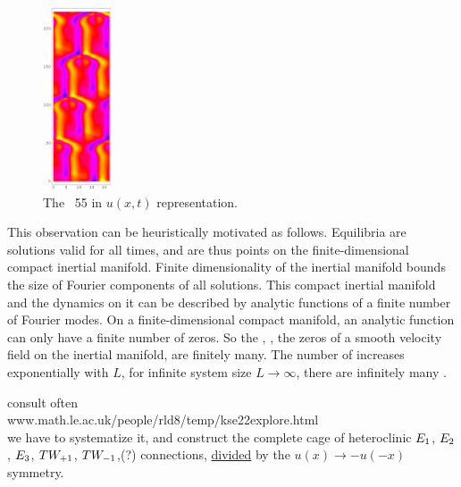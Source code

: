 \begin{figure}[t]
\begin{center} 
    \includegraphics[width=0.18\textwidth]{figs/rpo22-55-4-u.eps}
\end{center}
\caption{
 The \rpo\ {\nameit}55 in $u(x,t)$ representation. 
        }
\label{f:rpo55u}
\end{figure}




This observation can be heuristically motivated as follows. 
Equilibria are solutions valid for all times, and are thus points
on the finite-dimensional compact inertial manifold.
Finite dimensionality of the inertial manifold
bounds the size of Fourier components of all solutions.
This
compact inertial manifold and the dynamics on it can be 
described by analytic functions of a finite number of Fourier modes.
On a finite-dimensional compact manifold,
an analytic function can only have a finite number
of zeros. So the {\eqva}, {\ie},
the zeros of a smooth velocity field on
the inertial manifold, are finitely many.
The number of {\eqva} increases exponentially with $L$,
for infinite system size $L \to \infty$,
there are infinitely many {\eqva}. 

\bigskip

consult often
\\
        www.math.le.ac.uk/people/rld8/temp/kse22explore.html
\\
we have to systematize it, and
construct the complete cage of heteroclinic $E_{1}$, $E_{2}$, $E_{3}$,
$TW_{+1}$,
$TW_{-1}$,(?)
connections, \underline{divided} by the $u(x) \to - u(-x)$ symmetry.

